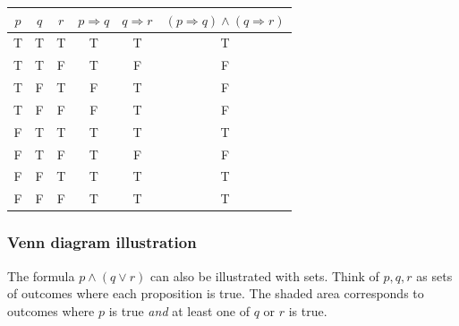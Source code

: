 \begin{center}
\begin{tabular}{|c|c|c||c|c|c|}
\hline
$p$ & $q$ & $r$ & $p \Rightarrow q$ & $q \Rightarrow r$ & $(p \Rightarrow q)\land(q \Rightarrow r)$ \\
\hline
T & T & T & T & T & T \\
T & T & F & T & F & F \\
T & F & T & F & T & F \\
T & F & F & F & T & F \\
F & T & T & T & T & T \\
F & T & F & T & F & F \\
F & F & T & T & T & T \\
F & F & F & T & T & T \\
\hline
\end{tabular}
\end{center}

\subsubsection{Venn diagram illustration}
The formula $p \land (q \lor r)$ can also be illustrated with sets. 
Think of $p,q,r$ as sets of outcomes where each proposition is true. 
The shaded area corresponds to outcomes where $p$ is true \emph{and} 
at least one of $q$ or $r$ is true.

\begin{center}
\end{center}

